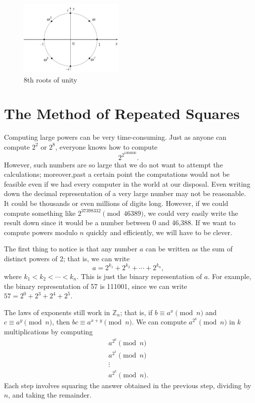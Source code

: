  
 
\begin{figure}[hbt]
\begin{center}
\centerline {
\includegraphics[width=2in]{rtsunity}
}
\end{center}
\caption{8th roots of unity}
\label{rtsunity}
\end{figure}
 
 
 
 
\section[The Method of Repeated Squares]{The Method of Repeated
Squares\protect\footnotemark} 
 
 
Computing large powers can be very time-consuming. Just as anyone can
compute $2^2$ or $2^8$, everyone knows how to compute
$$
2^{2^{1000000} }.
$$
However, such numbers are so large that we do not want to attempt the
calculations; moreover,past a certain point the computations would not
be feasible even if we had every computer in the world at our
disposal. Even 
writing down the decimal representation of a very large number may not
be reasonable. It could be thousands or even millions of digits long.
However, if we could compute something like $2^{37398332 } \pmod{
46389}$, we could very easily write the result down since it would be a
number between 0 and 46,388. If we want to compute powers modulo $n$
quickly and efficiently, we will have to be clever. 
 
 
The first thing to notice is that any number $a$ can be written as the
sum of distinct powers of 2; that is, we can write
$$
a = 2^{k_1} + 2^{k_2} + \cdots + 2^{k_n},
$$
where $k_1 < k_2 < \cdots < k_n$.  This is just the binary
representation of $a$. For example, the binary representation of 57 is
111001, since we can write $57 = 2^0 + 2^3 + 2^4 + 2^5$.
 
 
The laws of exponents still work in ${\mathbb Z}_n$; that is, if $b
\equiv a^x \pmod{ n}$ and $c \equiv a^y \pmod{ n}$, then $bc \equiv
a^{x+y} \pmod{ n}$. We can compute $a^{2^k} \pmod{ n}$ in $k$
multiplications by computing 
$$
\begin{array}{c}
a^{2^0} \pmod{ n} \\
a^{2^1} \pmod{ n }\\
\vdots \\
a^{2^k} \pmod{ n}.
\end{array}
$$
Each step involves squaring the answer obtained in the previous step,
dividing by $n$, and taking the remainder.
 
